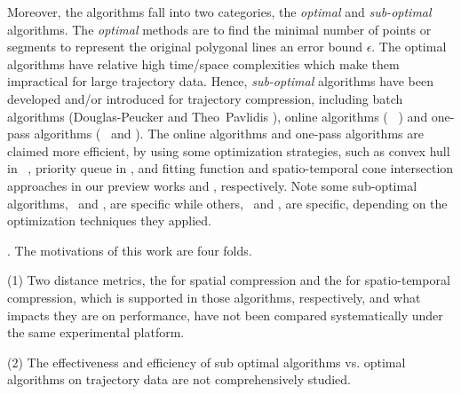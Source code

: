 Moreover, the \lsa algorithms fall into two categories, \ie the \textit{optimal} and \textit{sub-optimal} algorithms. 
The \textit{optimal} methods\cite{Imai:Optimal,Chan:Optimal} are to find the minimal number of points or segments to represent the original polygonal lines \wrt an error bound $\epsilon$.
%
The optimal \lsa algorithms have relative high time/space complexities which make them impractical for large trajectory data.
Hence, \textit{sub-optimal} \lsa algorithms have been developed and/or introduced for trajectory compression, including batch algorithms (\eg Douglas-Peucker \cite{Douglas:Peucker, Meratnia:Spatiotemporal} and Theo~Pavlidis \cite{Pavlidis:Segment}), online algorithms (\eg~\bqsa\cite{Liu:BQS} \squishe \cite{Muckell:Compression}) and one-pass algorithms (\eg~\operb \cite{Lin:Operb} and \cised \cite{Lin:Cised}). The online algorithms and one-pass algorithms are claimed more efficient, by using some optimization strategies, such as convex hull in \bqsa~\cite{Liu:BQS}, priority queue in \squishe \cite{Muckell:Compression}, and {fitting function} and spatio-temporal cone intersection approaches in our preview works \operb \cite {Lin:Operb} and \cised \cite {Lin:Cised}, respectively. Note some sub-optimal algorithms, \eg ~\bqsa and \operb, are \ped specific while others, \eg~\squishe and \cised, are \sed specific, depending on the optimization techniques they applied.

. The motivations of this work are four folds.

\ni (1) Two distance metrics, \ie the \ped for spatial compression and the \sed \cite{Meratnia:Spatiotemporal} for spatio-temporal compression, which is supported in those algorithms, respectively, and what impacts they are on performance, have not been compared systematically under the same experimental platform. 

\ni (2) The effectiveness and efficiency of sub optimal \lsa algorithms vs. optimal \lsa algorithms on trajectory data are not comprehensively studied.

